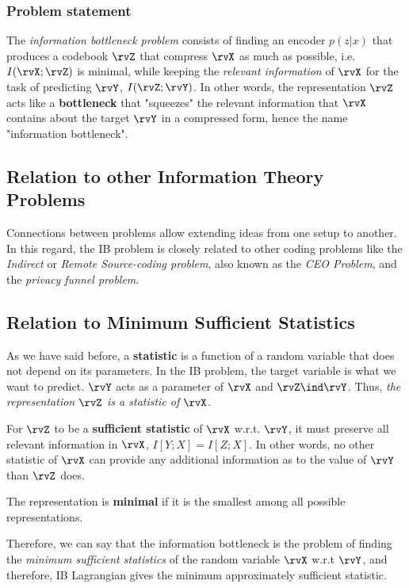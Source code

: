 \subsubsection{Problem statement}
The \emph{information bottleneck problem} consists of finding an encoder $p(z|x)$ that produces a codebook  $\rvZ$ that compress $\rvX$ as much as possible, i.e.\ $I(\rvX ; \rvZ)$ is minimal, while keeping the \emph{relevant information} of $\rvX$ for the task of predicting $\rvY$, $I(\rvZ;\rvY)$. In other words, the representation $\rvZ$ acts like a \textbf{bottleneck} that "squeezes" the relevant information that $\rvX$ contains about the target $\rvY$ in a compressed form, hence the name "information bottleneck".
\subsection{Relation to other Information Theory Problems}
Connections between problems allow extending ideas from one setup to another. In this regard, the IB problem is closely related to other coding problems like the \emph{Indirect} or \emph{Remote Source-coding problem}, also known as the \emph{CEO Problem}, and the \emph{privacy funnel problem}\cite{zaidi:2020}.
\subsection{Relation to Minimum Sufficient Statistics}
As we have said before,  a \textbf{statistic} is a function of a random variable that does not depend on its parameters. In the IB problem, the target variable is what we want to predict. $\rvY$ acts as a parameter of $\rvX$ and  $\rvZ \ind \rvY$. Thus, \emph{the representation $\rvZ$ is a statistic of $\rvX$}.

For $\rvZ$ to be a \textbf{sufficient statistic} of $\rvX$ w.r.t. $\rvY$, it must preserve all relevant information in $\rvX$, $I[Y;X]=I[Z;X]$. In other words, no other statistic of $\rvX$ can provide any additional information as to the value of $\rvY$ than $\rvZ$ does.

The representation is \textbf{minimal} if it is the smallest among all possible representations.

Therefore, we can say that the information bottleneck is the problem of finding the \emph{minimum sufficient statistics} of the random variable $\rvX$ w.r.t $\rvY$, and therefore, IB Lagrangian gives the minimum approximately sufficient statistic.
